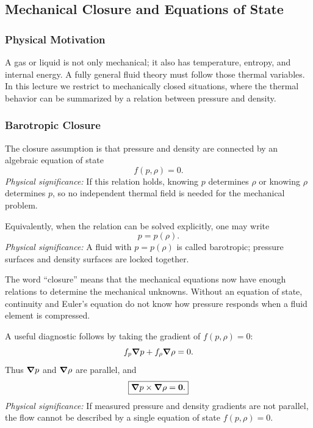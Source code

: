 \documentclass[../main.tex]{subfiles}
\begin{document}
\subsection{Mechanical Closure and Equations of State}\label{sec:lec12:closure}

\subsubsection*{Physical Motivation}
A gas or liquid is not only mechanical; it also has temperature, entropy, and internal energy. A fully general fluid theory must follow those thermal variables. In this lecture we restrict to mechanically closed situations, where the thermal behavior can be summarized by a relation between pressure and density.

\subsubsection{Barotropic Closure}\label{subsec:lec12:barotropic}
The closure assumption is that pressure and density are connected by an algebraic equation of state
\begin{equation}
  \boxed{f(p,\rho)=0.}
  \label{eq:lec12_equation_of_state_general}
\end{equation}
\textit{Physical significance:} If this relation holds, knowing $p$ determines $\rho$ or knowing $\rho$ determines $p$, so no independent thermal field is needed for the mechanical problem.

Equivalently, when the relation can be solved explicitly, one may write
\begin{equation}
  \boxed{p=p(\rho).}
  \label{eq:lec12_barotropic_relation}
\end{equation}
\textit{Physical significance:} A fluid with $p=p(\rho)$ is called barotropic; pressure surfaces and density surfaces are locked together.

\begin{note}
The word ``closure'' means that the mechanical equations now have enough relations to determine the mechanical unknowns. Without an equation of state, continuity and Euler's equation do not know how pressure responds when a fluid element is compressed.
\end{note}

A useful diagnostic follows by taking the gradient of $f(p,\rho)=0$:
\begin{equation}
  f_p\grad p+f_\rho\grad\rho=0.
  \label{eq:lec12_eos_gradient}
\end{equation}
Thus $\grad p$ and $\grad\rho$ are parallel, and
\begin{equation}
  \boxed{\grad p\times\grad\rho=\mathbf{0}.}
  \label{eq:lec12_barotropic_test}
\end{equation}
\textit{Physical significance:} If measured pressure and density gradients are not parallel, the flow cannot be described by a single equation of state $f(p,\rho)=0$.
\end{document}
